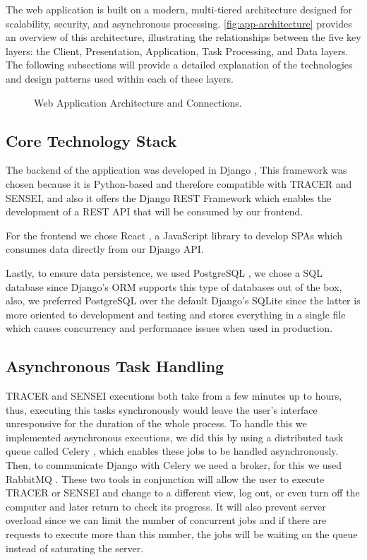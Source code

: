 The web application is built on a modern,
multi-tiered architecture designed for scalability, security, and asynchronous processing.
\autoref{fig:app-architecture} provides an overview of this architecture,
illustrating the relationships between the five key layers:
the Client, Presentation, Application, Task Processing, and Data layers.
The following subsections will provide a detailed explanation
of the technologies and design patterns used within each of these layers.

\begin{figure}[!htbp]
    \centering
    
    \caption{Web Application Architecture and Connections.}
    \label{fig:app-architecture}
\end{figure}

\subsection{Core Technology Stack}

The backend of the application was developed in Django \autocite{Django},
This framework was chosen because it is Python-based
and therefore compatible with \ac{TRACER} and SENSEI,
and also it offers the Django REST Framework \autocite{DjangoRESTFramework}
which enables the development of a \ac{REST} \ac{API}
that will be consumed by our frontend.

For the frontend we chose React \autocite{React},
a JavaScript library to develop \acp{SPA}
which consumes data directly from our Django \ac{API}.

Lastly, to ensure data persistence,
we used PostgreSQL \autocite{PostgreSQL2025},
we chose a \ac{SQL} database since Django's \ac{ORM} supports this type of databases out of the box,
also, we preferred PostgreSQL over the default Django's SQLite
since the latter is more oriented to development and testing
and stores everything in a single file which causes concurrency and performance issues when used in production.

\subsection{Asynchronous Task Handling}

\ac{TRACER} and SENSEI executions both take from a few minutes up to hours,
thus, executing this tasks synchronously would leave the user's interface unresponsive
for the duration of the whole process.
To handle this we implemented asynchronous executions,
we did this by using a distributed task queue called Celery \autocite{Celery},
which enables these jobs to be handled asynchronously.
Then, to communicate Django with Celery we need a broker,
for this we used RabbitMQ \autocite{RabbitMQ}.
These two tools in conjunction will allow the user to execute \ac{TRACER} or SENSEI
and change to a different view, log out, or even turn off the computer
and later return to check its progress.
It will also prevent server overload
since we can limit the number of concurrent jobs
and if there are requests to execute more than this number,
the jobs will be waiting on the queue instead of saturating the server.


